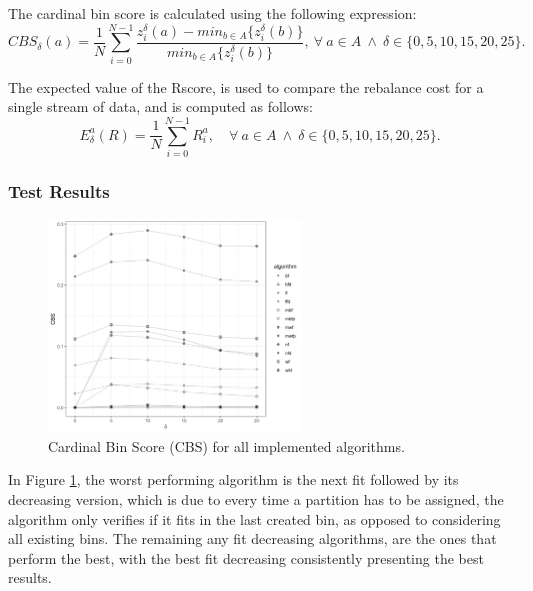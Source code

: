 The cardinal bin score is calculated using the following expression:
\begin{equation}
    CBS_\delta(a) = \frac{1}{N}
        \sum_{i=0}^{N-1} 
            \frac{  z_i^\delta(a) - min_{b \in A} \{z_i^\delta(b)\} }
                 {min_{b \in A} \{z_i^\delta(b)\} }, \ 
        \forall \ a \in A \ \wedge \ \delta \in \{0, 5, 10, 15, 20, 25\}. 
\end{equation}

The expected value of the Rscore, is used to compare the rebalance cost for a
single stream of data, and is computed as follows:
\begin{equation}
    E_\delta^a(R) = \frac{1}{N} 
        \sum_{i=0}^{N-1} R_i^a, \quad
        \forall \ a \in A \ \wedge \  \delta \in \{0, 5, 10, 15, 20, 25\}.
\end{equation}

\subsubsection{Test Results}
\label{subsub:test_results}

\begin{figure}[htb!] 
\centering
\includegraphics[width=0.6\textwidth]{images/controller/relative.png} 
\caption{
    Cardinal Bin Score (CBS) for all implemented algorithms.
} 
\label{fig:relative_nconsumers} 
\end{figure}

In Figure \ref{fig:relative_nconsumers}, the worst performing algorithm is the
next fit followed by its decreasing version, which is due to every time a
partition has to be assigned, the algorithm only verifies if it fits in the last
created bin, as opposed to considering all existing bins. The remaining any fit
decreasing algorithms, are the ones that perform the best, with the best fit
decreasing consistently presenting the best results. 

